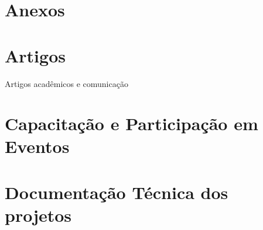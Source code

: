 \hypertarget{anexos}{%
\section{Anexos}\label{anexos}}

\hypertarget{artigos}{%
\section{Artigos}\label{artigos}}

Artigos acadêmicos e comunicação

\hypertarget{capacitauxe7uxe3o-e-participauxe7uxe3o-em-eventos}{%
\section{Capacitação e Participação em
Eventos}\label{capacitauxe7uxe3o-e-participauxe7uxe3o-em-eventos}}

\hypertarget{documentauxe7uxe3o-tuxe9cnica-dos-projetos}{%
\section{Documentação Técnica dos
projetos}\label{documentauxe7uxe3o-tuxe9cnica-dos-projetos}}
